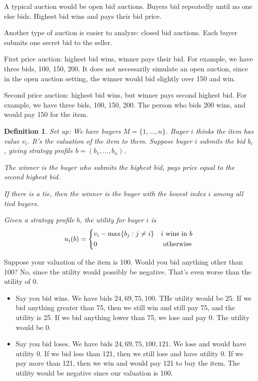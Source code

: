 \documentclass[twoside]{article}
\newtheorem{protodefinition}[prototheorem]{Definition}
\newenvironment{definition}
{\colorlet{shadecolor}{cyan!15}\begin{shaded}\begin{protodefinition}\normalfont}
		{\end{protodefinition}\end{shaded}}
\begin{document}
A typical auction would be open bid auctions. Buyers bid repeatedly until no one else bids. Highest bid wins and pays their bid price. 

Another type of auction is easier to analyze: closed bid auctions. Each buyer submits one secret bid to the seller. 

First price auction: highest bid wins, winner pays their bid. For example, we have three bids, 100, 150, 200. It does not necessarily simulate an open auction, since in the open auction setting, the winner would bid slightly over 150 and win. 

Second price auction: highest bid wins, but winner pays second highest bid. For example, we have three bids, 100, 150, 200. The person who bids 200 wins, and would pay 150 for the item. 

\begin{definition}
	Set up: We have buyers $M = \{1, ..., n\}$. Buyer $i$ thinks the item has value $v_i$. It's the valuation of the item to them. Suppose buyer $i$ submits the bid $b_i$, giving strategy profile $b = (b_1, ..., b_n)$. 
		
	The winner is the buyer who submits the highest bid, pays price equal to the second highest bid. 
		
	If there is a tie, then the winner is the buyer with the lowest index $i$ among all tied buyers. 
		
	Given a strategy profile $b$, the utility for buyer $i$ is $$u_i(b) = \begin{dcases}
	v_i - \max\{b_j : j \neq i\} & i \text{ wins in }b\\
	0 &\text{ otherwise}
	\end{dcases}$$
\end{definition}

Suppose your valuation of the item is 100. Would you bid anything other than 100? No, since the utility would possibly be negative. That's even worse than the utility of 0. 
\begin{itemize}
	\item Say you bid wins. We have bids $24, 69, 75, 100$. THe utility would be $25$. If we bid anything greater than 75, then we still win and still pay 75, and the utility is 25. If we bid anything lower than 75, we lose and pay 0. The utility would be 0.
	      	
	\item Say you bid loses. We have bids $24, 69, 75, 100, 121$. We lose and would have utility 0. If we bid less than 121, then we still lose and have utility 0. If we pay more than 121, then we win and would pay 121 to buy the item. The utility would be negative since our valuation is 100. 
\end{itemize}
\end{document}
